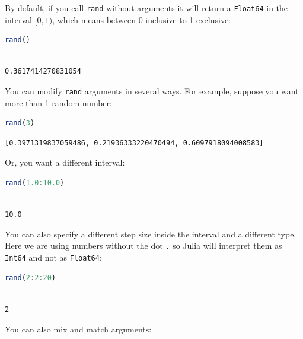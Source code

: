 \documentclass[
  notoc %
]{tufte-book}
\newcommand{\passthrough}[1]{#1}
\begin{document}
By default, if you call \passthrough{\lstinline!rand!} without arguments
it will return a \passthrough{\lstinline!Float64!} in the interval
\([0, 1)\), which means between 0 inclusive to 1 exclusive:

\begin{lstlisting}[language=Julia]
rand()
\end{lstlisting}

\begin{lstlisting}[language=Output]

0.3617414270831054

\end{lstlisting}

You can modify \passthrough{\lstinline!rand!} arguments in several ways.
For example, suppose you want more than 1 random number:

\begin{lstlisting}[language=Julia]
rand(3)
\end{lstlisting}

\begin{lstlisting}[language=Output]
[0.3971319837059486, 0.21936333220470494, 0.6097918094008583]
\end{lstlisting}

Or, you want a different interval:

\begin{lstlisting}[language=Julia]
rand(1.0:10.0)
\end{lstlisting}

\begin{lstlisting}[language=Output]

10.0

\end{lstlisting}

You can also specify a different step size inside the interval and a
different type. Here we are using numbers without the dot
\passthrough{\lstinline!.!} so Julia will interpret them as
\passthrough{\lstinline!Int64!} and not as
\passthrough{\lstinline!Float64!}:

\begin{lstlisting}[language=Julia]
rand(2:2:20)
\end{lstlisting}

\begin{lstlisting}[language=Output]

2

\end{lstlisting}

You can also mix and match arguments:
\end{document}
